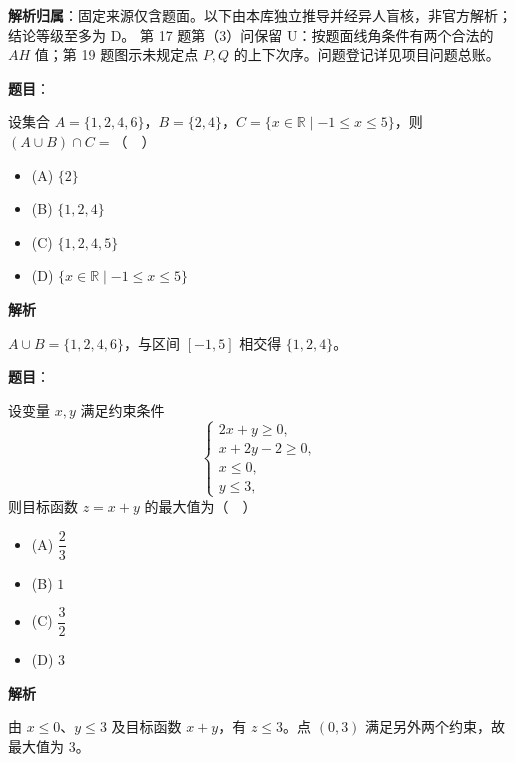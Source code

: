 

\begin{gknotice}
\textbf{解析归属}：固定来源仅含题面。以下由本库独立推导并经异人盲核，非官方解析；结论等级至多为 D。
第 17 题第（3）问保留 U：按题面线角条件有两个合法的 $AH$ 值；第 19 题图示未规定点 $P,Q$ 的上下次序。问题登记详见项目问题总账。
\end{gknotice}

\begin{answer}

\textbf{题目}：

设集合 $A=\{1,2,4,6\}$，$B=\{2,4\}$，$C=\{x\in\mathbb R\mid -1\leqslant x\leqslant5\}$，则 $(A\cup B)\cap C=$（　）

\begin{itemize}
\item (A) $\{2\}$
\item (B) $\{1,2,4\}$
\item (C) $\{1,2,4,5\}$
\item (D) $\{x\in\mathbb R\mid -1\leqslant x\leqslant5\}$
\end{itemize}

\textbf{解析}

$A\cup B=\{1,2,4,6\}$，与区间 $[-1,5]$ 相交得 $\{1,2,4\}$。


\end{answer}
\begin{answer}

\textbf{题目}：

设变量 $x,y$ 满足约束条件
\nopagebreak[4]
\[
\begin{cases}
2x+y\geqslant0,\\
x+2y-2\geqslant0,\\
x\leqslant0,\\
y\leqslant3,
\end{cases}
\]
则目标函数 $z=x+y$ 的最大值为（　）

\begin{itemize}
\item (A) $\dfrac23$
\item (B) $1$
\item (C) $\dfrac32$
\item (D) $3$
\end{itemize}

\textbf{解析}

由 $x\leqslant0$、$y\leqslant3$ 及目标函数 $x+y$，有 $z\leqslant3$。点 $(0,3)$ 满足另外两个约束，故最大值为 $3$。


\end{answer}
